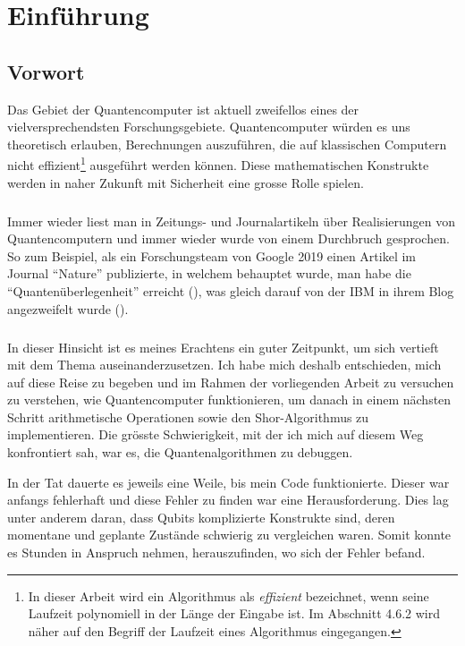 \chapter{Einführung}
\section{Vorwort}
Das Gebiet der Quantencomputer ist aktuell zweifellos eines der vielversprechendsten Forschungsgebiete. Quantencomputer würden es uns theoretisch erlauben, Berechnungen auszuführen, die auf klassischen Computern nicht effizient\footnote{In dieser Arbeit wird ein Algorithmus als \textit{effizient} bezeichnet, wenn seine Laufzeit polynomiell in der Länge der Eingabe ist. Im Abschnitt 4.6.2 wird näher auf den Begriff der Laufzeit eines Algorithmus eingegangen.} ausgeführt werden können. Diese mathematischen Konstrukte werden in naher Zukunft mit Sicherheit eine grosse Rolle spielen. 

\paragraph{}

Immer wieder liest man in Zeitungs- und Journalartikeln über Realisierungen von Quantencomputern und immer wieder wurde von einem Durchbruch gesprochen. So zum Beispiel, als ein Forschungsteam von Google 2019 einen Artikel im Journal "`Nature"' publizierte, in welchem behauptet wurde, man habe die "`Quantenüberlegenheit"' erreicht (\cite{GSP}), was gleich darauf von der IBM in ihrem Blog angezweifelt wurde (\cite{IBM}).

\paragraph{}

In dieser Hinsicht ist es meines Erachtens ein guter Zeitpunkt, um sich vertieft mit dem Thema auseinanderzusetzen. Ich habe mich deshalb entschieden, mich auf diese Reise zu begeben und im Rahmen der vorliegenden Arbeit zu versuchen zu verstehen, wie Quantencomputer funktionieren, um danach in einem nächsten Schritt arithmetische Operationen sowie den Shor-Algorithmus zu implementieren. Die grösste Schwierigkeit, mit der ich mich auf diesem Weg konfrontiert sah, war es, die Quantenalgorithmen zu debuggen.

In der Tat dauerte es jeweils eine Weile, bis mein Code funktionierte. Dieser war anfangs fehlerhaft und diese Fehler zu finden war eine Herausforderung. Dies lag unter anderem daran, dass Qubits komplizierte Konstrukte sind, deren momentane und geplante Zustände schwierig zu vergleichen waren. Somit konnte es Stunden in Anspruch nehmen, herauszufinden, wo sich der Fehler befand.

